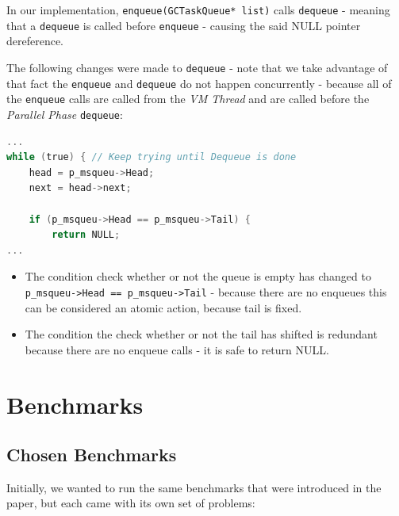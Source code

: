 \documentclass{article}
\begin{document}
In our implementation, \lstinline{enqueue(GCTaskQueue* list)} calls \lstinline{dequeue} - meaning that a \lstinline{dequeue} is called before \lstinline{enqueue} - causing the said NULL pointer dereference.

The following changes were made to \texttt{dequeue} - note that we take advantage of that fact the \texttt{enqueue} and \texttt{dequeue} do not happen concurrently - because all of the \lstinline{enqueue} calls are called from the \textit{VM Thread} and are called before the \textit{Parallel Phase} \lstinline{dequeue}:

\begin{lstlisting}[language=C]
...
while (true) { // Keep trying until Dequeue is done
    head = p_msqueu->Head; 
    next = head->next; 

    if (p_msqueu->Head == p_msqueu->Tail) { 
        return NULL; 
...
\end{lstlisting}

\begin{itemize}
\item The condition check whether or not the queue is empty has changed to \texttt{p\_msqueu->Head == p\_msqueu->Tail} - because there are no enqueues this can be considered an atomic action, because tail is fixed.
\item The condition the check whether or not the tail has shifted is redundant because there are no enqueue calls - it is safe to return NULL.
\end{itemize}

 \newpage

 \section{Benchmarks}
 \subsection{Chosen Benchmarks}
 Initially, we wanted to run the same benchmarks that were introduced in the paper, but each came with its own set of problems:
\end{document}
